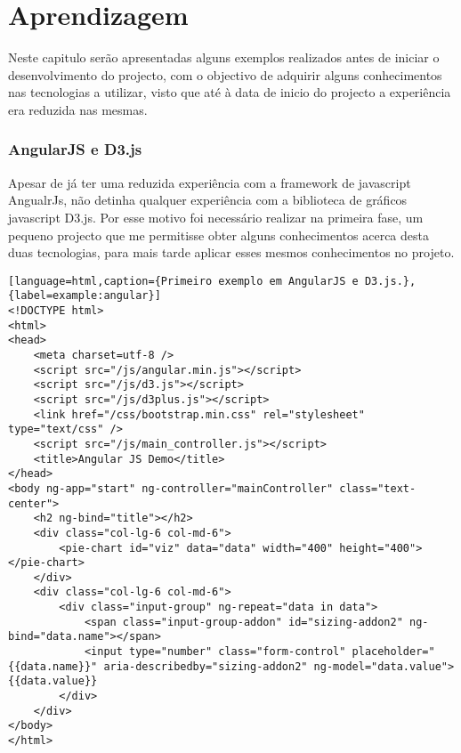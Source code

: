 \chapter{Aprendizagem}
\label{cap4}
\par Neste capitulo serão apresentadas alguns exemplos realizados antes de iniciar o desenvolvimento do projecto, com o objectivo de adquirir alguns conhecimentos nas tecnologias a utilizar, visto que até à data de inicio do projecto a experiência era reduzida nas mesmas.

\subsection{AngularJS e D3.js}
\par Apesar de já ter uma reduzida experiência com a framework de javascript AngualrJs, não detinha qualquer experiência com a biblioteca de gráficos javascript D3.js. Por esse motivo foi necessário realizar na primeira fase, um pequeno projecto que me permitisse obter alguns conhecimentos acerca desta duas tecnologias, para mais tarde aplicar esses mesmos conhecimentos no projeto. 

\begin{lstlisting}[language=html,caption={Primeiro exemplo em AngularJS e D3.js.},{label=example:angular}]
<!DOCTYPE html>
<html>
<head>
    <meta charset=utf-8 />
    <script src="/js/angular.min.js"></script>
    <script src="/js/d3.js"></script>
    <script src="/js/d3plus.js"></script>
    <link href="/css/bootstrap.min.css" rel="stylesheet" type="text/css" />
    <script src="/js/main_controller.js"></script>
    <title>Angular JS Demo</title>
</head>
<body ng-app="start" ng-controller="mainController" class="text-center">
    <h2 ng-bind="title"></h2>
    <div class="col-lg-6 col-md-6">
        <pie-chart id="viz" data="data" width="400" height="400"></pie-chart>
    </div>
    <div class="col-lg-6 col-md-6">
        <div class="input-group" ng-repeat="data in data">
            <span class="input-group-addon" id="sizing-addon2" ng-bind="data.name"></span>
            <input type="number" class="form-control" placeholder="{{data.name}}" aria-describedby="sizing-addon2" ng-model="data.value">{{data.value}}
        </div>
    </div>
</body>
</html>
\end{lstlisting}


